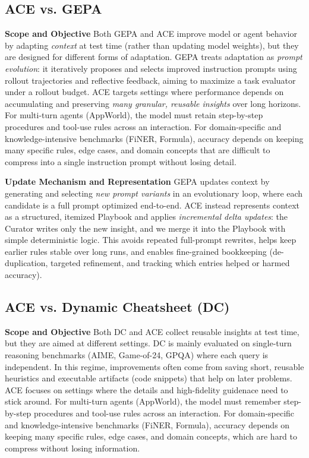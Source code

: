 \subsection{ACE vs. GEPA}
\textbf{Scope and Objective}
Both GEPA and ACE improve model or agent behavior by adapting \emph{context} at test time (rather than updating model weights), but they are designed for different forms of adaptation.
GEPA treats adaptation as \emph{prompt evolution}: it iteratively proposes and selects improved instruction prompts using rollout trajectories and reflective feedback, aiming to maximize a task evaluator under a rollout budget.
ACE targets settings where performance depends on accumulating and preserving \emph{many granular, reusable insights} over long horizons.
For multi-turn agents (\eg AppWorld), the model must retain step-by-step procedures and tool-use rules across an interaction.
For domain-specific and knowledge-intensive benchmarks (\eg FiNER, Formula), accuracy depends on keeping many specific rules, edge cases, and domain concepts that are difficult to compress into a single instruction prompt without losing detail.

\textbf{Update Mechanism and Representation}
GEPA updates context by generating and selecting \emph{new prompt variants} in an evolutionary loop, where each candidate is a full prompt optimized end-to-end. 
ACE instead represents context as a structured, itemized Playbook and applies \emph{incremental delta updates}: the Curator writes only the new insight, and we merge it into the Playbook with simple deterministic logic. 
This avoids repeated full-prompt rewrites, helps keep earlier rules stable over long runs, and enables fine-grained bookkeeping (\eg de-duplication, targeted refinement, and tracking which entries helped or harmed accuracy). 

\subsection{ACE vs. Dynamic Cheatsheet (DC)} 
\textbf{Scope and Objective}  
Both DC and ACE collect reusable insights at test time, but they are aimed at different settings.
DC is mainly evaluated on single-turn reasoning benchmarks (\eg AIME, Game-of-24, GPQA) where each query is independent. In this regime, improvements often come from saving short, reusable heuristics and executable artifacts (\eg code snippets) that help on later problems.
ACE focuses on settings where the details and high-fidelity guidenace need to stick around. 
For multi-turn agents (\eg AppWorld), the model must remember step-by-step procedures and tool-use rules across an interaction. 
For domain-specific and knowledge-intensive benchmarks (\eg FiNER, Formula), accuracy depends on keeping many specific rules, edge cases, and domain concepts, which are hard to compress without losing information.

